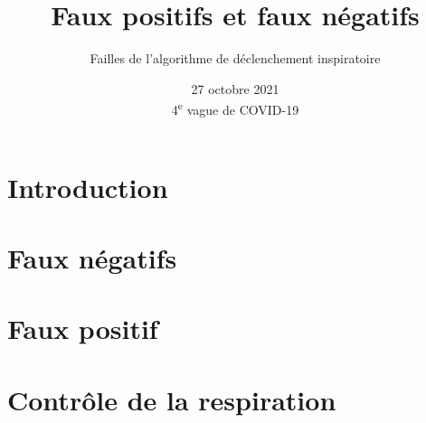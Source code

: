 \documentclass[
	aspectratio=169,
	xcolor=table,
]{beamer}
\title{Faux positifs et faux négatifs}
\subtitle{Failles de l'algorithme de déclenchement inspiratoire}
\author{\ninh}
\date{27 octobre 2021\\\scriptsize4\textsuperscript{e} vague de COVID-19}
\institute{\inhg\linebreak\chum}
\begin{document}


\section{Introduction}

\section{Faux négatifs}







\section{Faux positif}





\appendix

\section{Contrôle de la respiration}



\end{document}
